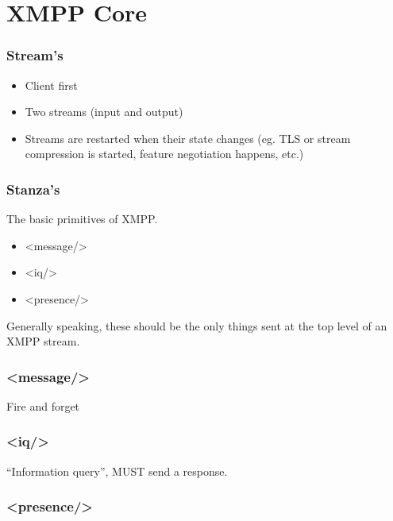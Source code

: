 \documentclass[xelatex]{beamer}
\newcommand*{\stanza}[1]{\textless #1/\textgreater}
\begin{document}
	\section[]{XMPP Core}
	\frame{\sectionpage}

	\begin{frame}
		\frametitle{Stream's}
		\begin{itemize}
			\item Client first
			\item Two streams (input and output)
			\item Streams are restarted when their state changes (eg. TLS or stream
				compression is started, feature negotiation happens, etc.)
		\end{itemize}
	\end{frame}

	\begin{frame}
		\frametitle{Stanza's}
		The basic primitives of XMPP.
		\begin{itemize}
			\item \stanza{message}
			\item \stanza{iq}
			\item \stanza{presence}
		\end{itemize}

		Generally speaking, these should be the only things sent at the top level of
		an XMPP stream.
	\end{frame}

	\begin{frame}
		\frametitle{\stanza{message}}
		Fire and forget
	\end{frame}

	\begin{frame}
		\frametitle{\stanza{iq}}
		``Information query'', MUST send a response.
	\end{frame}

	\begin{frame}
		\frametitle{\stanza{presence}}
	\end{frame}
\end{document}
